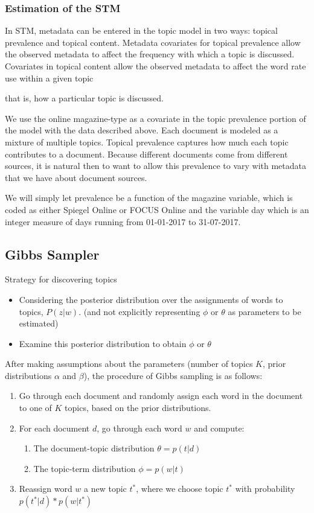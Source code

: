 \documentclass[12pt,a4paper,notitlepage]{article}
\begin{document}
\subsubsection{Estimation of the STM}
In STM, metadata can be entered in the topic model in two ways: topical prevalence and topical content. Metadata covariates for topical prevalence allow the observed metadata to affect the frequency with which a topic is discussed. Covariates in topical content allow the observed metadata to affect the word rate use within a given topic{that is, how a particular topic is discussed.

We use the online magazine-type as a covariate in the topic prevalence portion of the model with the  data described above. Each document is modeled as a mixture of multiple topics. Topical prevalence captures how much each topic contributes to a document. Because different documents come from different sources, it is natural then to want to allow this prevalence to vary with metadata that we have about document sources.

We will simply let prevalence be a function of the magazine variable, which is coded as either
Spiegel Online or FOCUS Online and the variable day which is an integer measure of days running from 01-01-2017 to 31-07-2017.

\subsection{Gibbs Sampler}\label{section_gibbs}

Strategy for discovering topics  \cite{griffiths_finding_2004}
\begin{itemize}
	\item Considering the posterior distribution over the assignments of words to topics, $P(z|w)$. (and not explicitly representing $\phi$ or $\theta$ as parameters to be estimated)
	\item Examine this posterior distribution to obtain $\phi$ or $\theta$
\end{itemize}


After making assumptions about the parameters (number of topics $K$, prior distributions $\alpha$ and $\beta$), the procedure of Gibbs sampling is as follows:

\begin{enumerate}
	\item Go through each document and randomly assign each word in the document to one of $K$ topics, based on the prior distributions.
	\item For each document $d$, go through each word $w$ and compute:
	\begin{enumerate}
		\item The document-topic distribution $\theta = p(t|d)$
		\item The topic-term distribution $\phi = p(w|t)$
	\end{enumerate}
	\item Reassign word $w$ a new topic $t^*$, where we choose topic $t^*$ with probability $p(t^*|d)*p(w|t^*)$
\end{enumerate}

}
\end{document}
